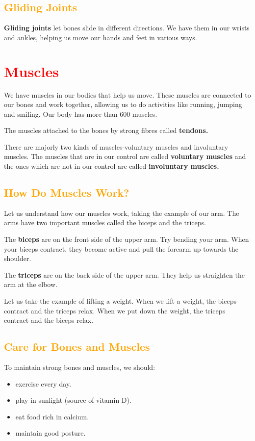 \subsection{\textcolor{orange}{Gliding Joints}}
\textbf{Gliding joints} let bones slide in different directions. We have them in our wrists and ankles, helping us move our hands and feet in various ways.
\vspace{2.1in}
\section{\textcolor{red}{Muscles}}
We have muscles in our bodies that help us move. These muscles are connected to our bones and work together, allowing us to do activities like running, jumping and smiling. Our body has more than 600 muscles.
\vspace{0.1in}
\par
The muscles attached to the bones by strong fibres called \textbf{tendons.}
\vspace{0.1in}
\par
There are majorly two kinds of muscles-voluntary muscles and involuntary muscles. The muscles that are in our control are called \textbf{voluntary muscles} and the ones which are not in our control are called \textbf{involuntary muscles.}
\subsection{\textcolor{orange}{How Do Muscles Work?}}
Let us understand how our muscles work, taking the example of our arm. The arms have two important muscles called the biceps and the triceps.
\vspace{0.1in}
\par
The \textbf{biceps} are on the front side of the upper arm. Try bending your arm. When your biceps contract, they become active and pull the forearm up towards the shoulder.
\vspace{0.1in}
\par
The \textbf{triceps} are on the back side of the upper arm. They help us straighten the arm at the elbow.
\vspace{0.1in}
\par
Let us take the example of lifting a weight. When we lift a weight, the biceps contract and the triceps relax. When we put down the weight, the triceps contract and the biceps relax.
\vspace{1.1in}
\subsection{\textcolor{orange}{Care for Bones and Muscles}}
To maintain strong bones and muscles, we should:
\vspace{0.1in}
\begin{itemize}
    \item exercise every day.
    \item play in sunlight (source of vitamin D).
    \item eat food rich in calcium.
    \item maintain good posture.
\end{itemize}
